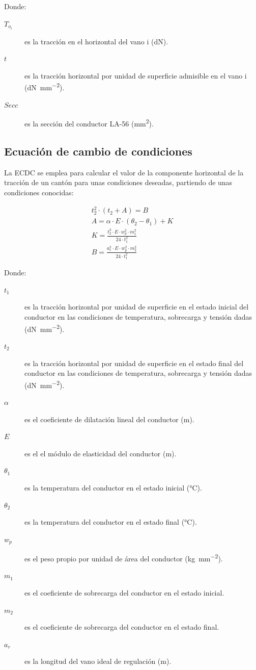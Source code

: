 Donde:
\begin{description}
  \item[$T_{o_i}$] es la tracción en el horizontal del vano i (\si{\deca\newton}).
  \item[$t$] es la tracción horizontal por unidad de superficie admisible en el vano i (\si{\deca\newton\per\milli\meter\squared}).
  \item[$Secc$] es la sección del conductor LA-56 (\si{\milli\meter\squared}).
\end{description}

\subsection{Ecuación de cambio de condiciones}
\label{subsec:cm-ECDC}
La \ac{ECDC} se emplea para calcular el valor de la componente horizontal de la tracción de un cantón para unas condiciones deseadas, partiendo de unas condiciones conocidas:

\begin{gather}
    t_2^2 \cdot (t_2 + A) = B
    \label{eq:ECDC} \\[0.5em]
    A = \alpha \cdot E \cdot (\theta_2 - \theta_1) + K
    \label{eq:ECDC-A} \\[0.5em]
    K = \frac{t_2^2 \cdot E \cdot w_p^2 \cdot m_1^2}{24 \cdot t_1^2}
    \label{eq:ECDC-K} \\[0.5em]
    B = \frac{a_r^2 \cdot E \cdot w_p^2 \cdot m_2^2}{24 \cdot t_1^2}
    \label{eq:ECDC-B}
\end{gather}

Donde:
\begin{description}
  \item[$t_1$] es la tracción horizontal por unidad de superficie en el estado inicial del conductor en las condiciones de temperatura, sobrecarga y tensión dadas (\si{\deca\newton\per\milli\meter\squared}).
  \item[$t_2$] es la tracción horizontal por unidad de superficie en el estado final del conductor en las condiciones de temperatura, sobrecarga y tensión dadas (\si{\deca\newton\per\milli\meter\squared}).
  \item[$\alpha$] es el coeficiente de dilatación lineal del conductor (\si{\meter}).
  \item[$E$] es el el módulo de elasticidad del conductor (\si{\meter}).
  \item[$\theta_1$] es la temperatura del conductor en el estado inicial (\si{\celsius}).
  \item[$\theta_2$] es la temperatura del conductor en el estado final (\si{\celsius}).
  \item[$w_p$] es el peso propio por unidad de área del conductor (\si{\kilo\gram\per\milli\meter\squared}).
  \item[$m_1$] es el coeficiente de sobrecarga del conductor en el estado inicial.
  \item[$m_2$] es el coeficiente de sobrecarga del conductor en el estado final.
  \item[$a_r$] es la longitud del vano ideal de regulación (\si{\meter}).
\end{description}

